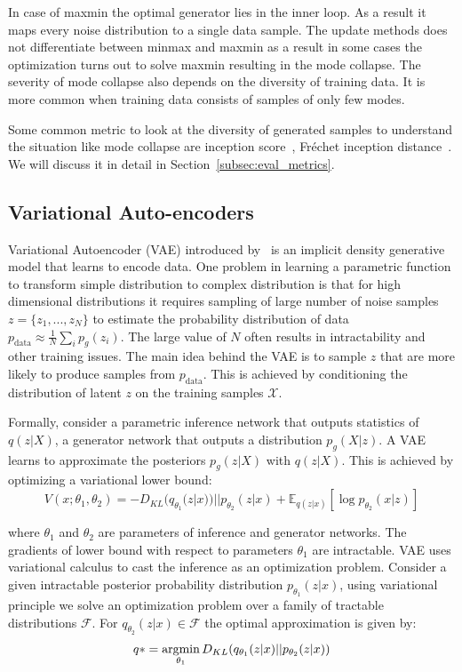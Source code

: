 In case of maxmin the optimal generator lies in the inner loop. As a result it maps every noise distribution to a single data sample. The update methods does not differentiate between minmax and maxmin as a result in some cases the optimization turns out to solve maxmin resulting in the mode collapse. The severity of mode collapse also depends on the diversity of training data. It is more common when training data consists of samples of only few modes. 

Some common metric to look at the diversity of generated samples to understand the situation like mode collapse are inception score~\cite{salimans2016improved}, Fr\'echet inception distance~\cite{heusel2017gans}. We will discuss it in detail in Section~\ref{subsec:eval_metrics}.


\subsection{Variational Auto-encoders}
\label{subsec:vae}
Variational Autoencoder (VAE) introduced by~\cite{kingma2013auto} is an implicit density generative model that learns to encode data. One problem in learning a parametric function to transform simple distribution to complex distribution is that for high dimensional distributions it requires sampling of large number of noise samples $z=\{z_1,...,z_N\}$ to estimate the probability distribution of data $p_\text{data}\approx \frac{1}{N}\sum_i p_g(z_i)$. The large value of $N$ often results in intractability and other training issues. The main idea behind the VAE is to sample $z$ that are more likely to produce samples from $p_\text{data}$. This is achieved by conditioning the distribution of latent $z$ on the training samples $\mathcal{X}$. 

Formally, consider a parametric inference network that outputs statistics of $q(z|X)$, a generator network that outputs a distribution $p_g(X|z)$. A VAE learns to approximate the posteriors $p_g(z|X)$ with $q(z|X)$. This is achieved by optimizing a variational lower bound:
\begin{equation}
    V(x; \theta_1,\theta_2) = - D_{KL}(q_{\theta_1} (z|x)) || p_{\theta_2} (z|x) + \mathbb{E}_{q(z|x)} [\log p_{\theta_2} (x|z)]
\end{equation}

where $\theta_1$ and $\theta_2$ are parameters of inference and generator networks. The gradients of lower bound  with respect to parameters $\theta_1$ are intractable. VAE uses variational calculus to cast the inference as an optimization problem. Consider a given intractable posterior probability distribution $p_{\theta_1}(z|x)$, using variational principle we solve an optimization problem over a family of tractable distributions $\mathcal{F}$. For $q_{\theta_2}(z|x) \in \mathcal{F}$ the optimal approximation is given by:
\begin{equation}
    q\ast = \operatorname*{argmin}_{\theta_1} D_{KL} (q_{\theta_1}(z|x) || p_{\theta_2}(z|x))
\end{equation}

